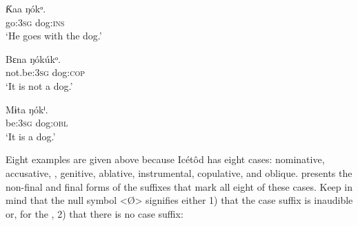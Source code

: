  
\ea\label{ex:case:6}
\gll Ƙaa     ŋókᵒ. \\ 
go:\textsc{3sg}  dog:\textsc{ins}    \\
\glt ‘He goes with the dog.’ 
\z



 
\ea\label{ex:case:7}
\gll Bɛna     ŋókúkᵒ. \\ 
not.be:\textsc{3sg}  dog:\textsc{cop}    \\
\glt ‘It is not a dog.’ 
\z



 
\ea\label{ex:case:8}
\gll Mɨta     ŋókⁱ. \\ 
be:\textsc{3sg}  dog:\textsc{obl}    \\
\glt ‘It is a dog.’ 
\z


Eight examples are given above because Icétôd has eight cases: nominative, accusative, , genitive, ablative, instrumental, copulative, and oblique.  presents the non-final and final forms of the suffixes that mark all eight of these cases. Keep in mind that the null symbol <Ø> signifies either 1) that the case suffix is inaudible or, for the , 2) that there is no case suffix:


